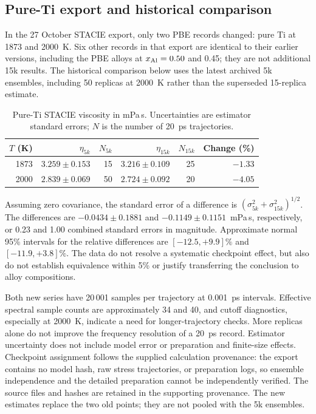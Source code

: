 \documentclass[10pt]{article}
\begin{document}
\subsection{Pure-Ti export and historical comparison}
In the 27 October STACIE export, only two PBE records changed: pure Ti at 1873 and 2000~K. Six other records in that export are identical to their earlier versions, including the PBE alloys at $x_{\rm Al}=0.50$ and 0.45; they are not additional 15k results. The historical comparison below uses the latest archived 5k ensembles, including 50 replicas at 2000~K rather than the superseded 15-replica estimate.

\begin{table}[htbp]
\centering
\caption{Pure-Ti STACIE viscosity in mPa\,s. Uncertainties are estimator standard errors; $N$ is the number of 20~ps trajectories.}
\label{tab:viscosity15k}
\begin{tabular}{rrrrrr}
\toprule
$T$ (K) & $\eta_{5k}$ & $N_{5k}$ & $\eta_{15k}$ & $N_{15k}$ & Change (\%)\\
\midrule
1873 & $3.259\pm0.153$ & 15 & $3.216\pm0.109$ & 25 & $-1.33$\\
2000 & $2.839\pm0.069$ & 50 & $2.724\pm0.092$ & 20 & $-4.05$\\
\bottomrule
\end{tabular}
\end{table}

Assuming zero covariance, the standard error of a difference is $(\sigma_{5k}^2+\sigma_{15k}^2)^{1/2}$. The differences are $-0.0434\pm0.1881$ and $-0.1149\pm0.1151$~mPa\,s, respectively, or 0.23 and 1.00 combined standard errors in magnitude. Approximate normal 95\% intervals for the relative differences are $[-12.5,+9.9]\%$ and $[-11.9,+3.8]\%$. The data do not resolve a systematic checkpoint effect, but also do not establish equivalence within 5\% or justify transferring the conclusion to alloy compositions.

Both new series have 20\,001 samples per trajectory at 0.001~ps intervals. Effective spectral sample counts are approximately 34 and 40, and cutoff diagnostics, especially at 2000~K, indicate a need for longer-trajectory checks. More replicas alone do not improve the frequency resolution of a 20~ps record. Estimator uncertainty does not include model error or preparation and finite-size effects. Checkpoint assignment follows the supplied calculation provenance: the export contains no model hash, raw stress trajectories, or preparation logs, so ensemble independence and the detailed preparation cannot be independently verified. The source files and hashes are retained in the supporting provenance. The new estimates replace the two old points; they are not pooled with the 5k ensembles.
\end{document}
